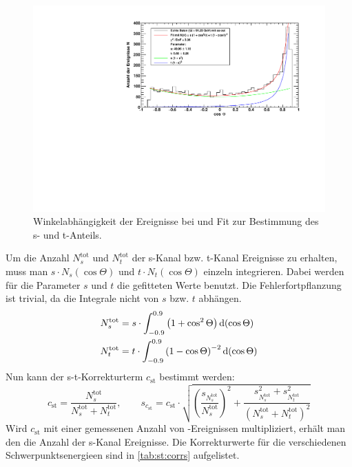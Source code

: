 \begin{figure}[H]
    \begin{center}
        \includegraphics[width=\textwidth]{../img/s_t_fit_91-23.pdf}
        \caption{Winkelabhängigkeit der Ereignisse bei  und Fit zur Bestimmung des s- und t-Anteils.}
        \label{img:st:9123}
    \end{center}
\end{figure}
Um die Anzahl $N_s^\text{tot}$ und $N_t^\text{tot}$ der s-Kanal bzw. t-Kanal Ereignisse zu erhalten, muss man
$s \cdot N_s(\cos \Theta)$ und $t \cdot N_t(\cos \Theta)$ einzeln integrieren. Dabei werden für die Parameter $s$ und $t$ die
gefitteten Werte benutzt. Die Fehlerfortpflanzung ist trivial, da die Integrale nicht von $s$ bzw. $t$ abhängen.
\begin{equation}
    \begin{split}
        & N_s^\text{tot} = s \cdot \int_{-0.9}^{0.9} \left( 1 + \cos^2 \Theta \right) \mathrm{d} (\cos \Theta) \\
        & N_t^\text{tot} = t \cdot \int_{-0.9}^{0.9} \left( 1 - \cos \Theta \right)^{-2} \mathrm{d} (\cos \Theta)
    \end{split}
\end{equation}
Nun kann der s-t-Korrekturterm $c_{\text{st}}$ bestimmt werden:
\begin{equation}
    c_{\text{st}} = \frac{N_s^\text{tot}}{N_s^\text{tot} + N_t^\text{tot}}, \qquad
    s_{c_{\text{st}}} = c_{\text{st}} \cdot \sqrt{ \left( \frac{s_{N_s^\text{tot}}}{N_s^\text{tot}} \right)^2 +
    \frac{s_{N_s^\text{tot}}^2 + s_{N_t^\text{tot}}^2}{ \left( N_s^\text{tot} + N_t^\text{tot} \right)^2 } }
\end{equation}
Wird $c_{\text{st}}$ mit einer gemessenen Anzahl von \ee -Ereignissen multipliziert, erhält man den die Anzahl der s-Kanal Ereignisse.
Die Korrekturwerte für die verschiedenen Schwerpunktsenergieen sind in \autoref{tab:st:corrs} aufgelistet.


